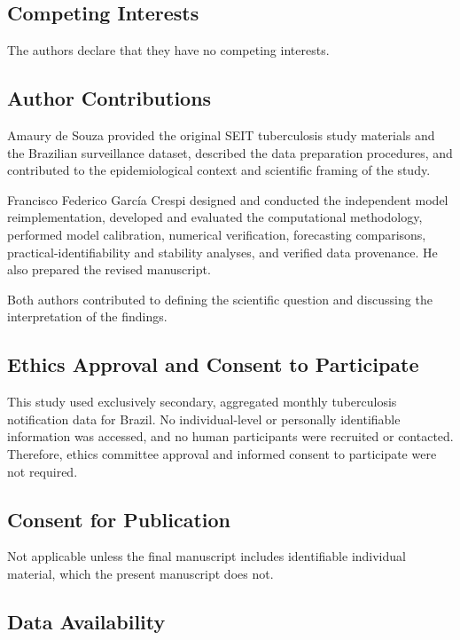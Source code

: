 \documentclass[pdflatex,sn-mathphys-ay]{sn-jnl}
\begin{document}
\subsection{Competing Interests}

The authors declare that they have no competing interests.


\subsection{Author Contributions}

Amaury de Souza provided the original SEIT tuberculosis study materials and the Brazilian surveillance dataset, described the data preparation procedures, and contributed to the epidemiological context and scientific framing of the study.

Francisco Federico Garc\'ia Crespi designed and conducted the independent model reimplementation, developed and evaluated the computational methodology, performed model calibration, numerical verification, forecasting comparisons, practical-identifiability and stability analyses, and verified data provenance. He also prepared the revised manuscript.

Both authors contributed to defining the scientific question and discussing the interpretation of the findings.


\subsection{Ethics Approval and Consent to Participate}

This study used exclusively secondary, aggregated monthly tuberculosis notification data for Brazil. No individual-level or personally identifiable information was accessed, and no human participants were recruited or contacted. Therefore, ethics committee approval and informed consent to participate were not required.

\subsection{Consent for Publication}

Not applicable unless the final manuscript includes identifiable individual material, which the present manuscript does not.

\subsection{Data Availability}
\end{document}
